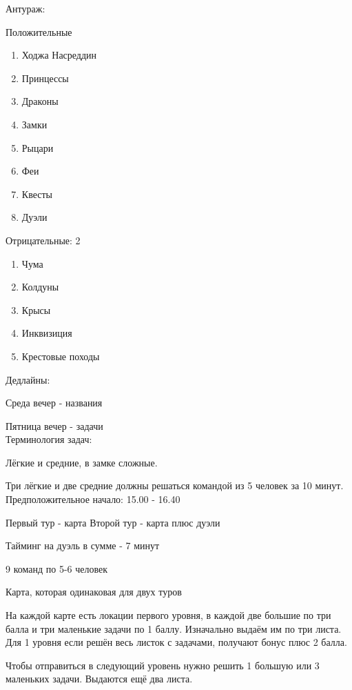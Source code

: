 \documentclass[a4paper,12pt]{article}
\begin{document}

Антураж:

Положительные\\

\begin{enumerate}
\item Ходжа Насреддин
\item Принцессы
\item Драконы
\item Замки
\item Рыцари
\item Феи
\item Квесты
\item Дуэли
\end{enumerate}

Отрицательные:
2
\begin{enumerate}
\item Чума
\item Колдуны
\item Крысы
\item Инквизиция
\item Крестовые походы
\end{enumerate}

Дедлайны:

Среда вечер - названия

Пятница вечер - задачи\\

Терминология задач:

Лёгкие и средние, в замке сложные.

Три лёгкие и две средние должны решаться командой из 5 человек за 10 минут.
\\

Предположительное начало: 15.00 - 16.40

Первый тур - карта
Второй тур - карта плюс дуэли

Тайминг на дуэль в сумме - 7 минут

9 команд по 5-6 человек



Карта, которая одинаковая для двух туров

На каждой карте есть локации первого уровня, в каждой две большие по три балла и три маленькие задачи по 1 баллу. Изначально выдаём им по три листа. Для 1 уровня если решён весь листок с задачами, получают бонус плюс 2 балла.


 Чтобы отправиться в следующий уровень нужно решить 1 большую или 3 маленьких задачи. Выдаются ещё два листа.
\end{document}
